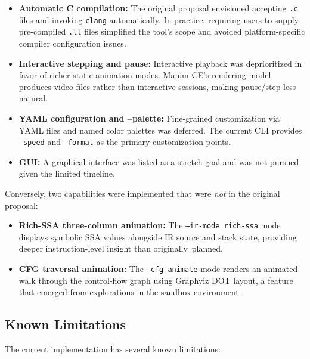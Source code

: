 \begin{itemize}
    \item \textbf{Automatic C compilation:} The original proposal envisioned accepting \texttt{.c} files and invoking \texttt{clang} automatically. In practice, requiring users to supply pre-compiled \texttt{.ll} files simplified the tool's scope and avoided platform-specific compiler configuration issues.

    \item \textbf{Interactive stepping and pause:} Interactive playback was deprioritized in favor of richer static animation modes. Manim CE's rendering model produces video files rather than interactive sessions, making pause/step less natural.

    \item \textbf{YAML configuration and --palette:} Fine-grained customization via YAML files and named color palettes was deferred. The current CLI provides \texttt{--speed} and \texttt{--format} as the primary customization points.

    \item \textbf{GUI:} A graphical interface was listed as a stretch goal and was not pursued given the limited timeline.
\end{itemize}

Conversely, two capabilities were implemented that were \textit{not} in the original proposal:
\begin{itemize}
    \item \textbf{Rich-SSA three-column animation:} The \texttt{--ir-mode rich-ssa} mode displays symbolic SSA values alongside IR source and stack state, providing deeper instruction-level insight than originally~planned.
    \item \textbf{CFG traversal animation:} The \texttt{--cfg-animate} mode renders an animated walk through the control-flow graph using Graphviz DOT layout, a feature that emerged from explorations in the sandbox environment.
\end{itemize}

\subsection{Known Limitations}
The current implementation has several known limitations:

